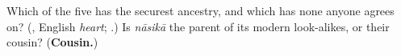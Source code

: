 \begin{tcolorbox}[breakable,colback=teal!4,colframe=teal!35!black,title={Before you move on}]
Which of the five has the securest ancestry, and which has none anyone agrees on? (\textbf{}, English \emph{heart}; \textbf{}.) Is \emph{nāsikā} the parent of its modern look-alikes, or their cousin? (\textbf{Cousin.})
\end{tcolorbox}
